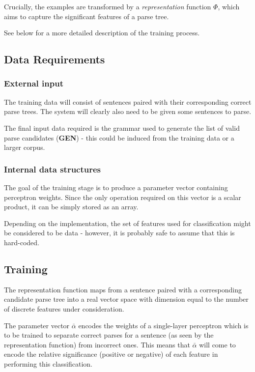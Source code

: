 \documentclass[11pt]{article}
\begin{document}
Crucially, the examples are transformed by a \emph{representation} function
$\Phi$, which aims to capture the significant features of a parse tree.

See below for a more detailed description of the training process.

\subsection*{Data Requirements}

\subsubsection*{External input}
The training data will consist of sentences paired with their corresponding
correct parse trees.  The system will clearly also need to be given some
sentences to parse.

The final input data required is the grammar used to generate the list of valid parse candidates (\textbf{GEN}) - this could be induced from the training data or a larger corpus.

\subsubsection*{Internal data structures}

The goal of the training stage is to produce a parameter vector containing
perceptron weights. Since the only operation required on this vector is a
scalar product, it can be simply stored as an array.

Depending on the implementation, the set of features used for classification
might be considered to be data - however, it is probably safe to assume that
this is hard-coded.

\subsection*{Training}

The representation function maps from a sentence paired with a corresponding
candidate parse tree into a real vector space with dimension equal to the
number of discrete features under consideration.

The parameter vector $\bar{\alpha}$ encodes the weights of a single-layer
perceptron which is to be trained to separate correct parses for a sentence (as
seen by the representation function) from incorrect ones.  This means that
$\bar{\alpha}$ will come to encode the relative significance (positive or
negative) of each feature in performing this classification.
\end{document}
